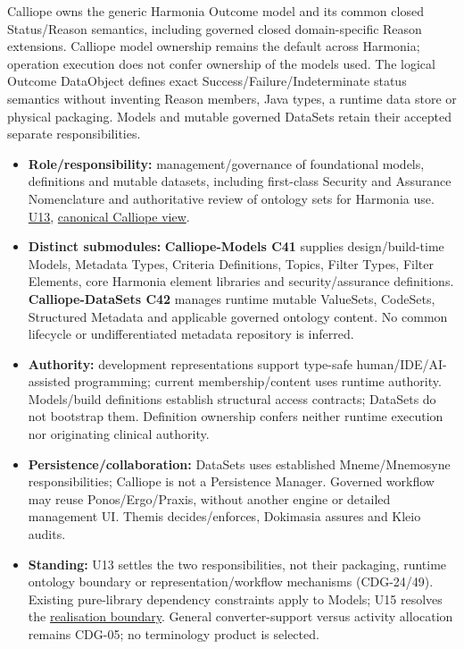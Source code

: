 Calliope owns the generic Harmonia Outcome model and its common closed Status/Reason semantics, including governed closed domain-specific Reason extensions. Calliope model ownership remains the default across Harmonia; operation execution does not confer ownership of the models used. The logical Outcome DataObject defines exact Success/Failure/Indeterminate status semantics without inventing Reason members, Java types, a runtime data store or physical packaging. Models and mutable governed DataSets retain their accepted separate responsibilities.



\begin{itemize}


\item \textbf{Role/responsibility:} management/governance of foundational models, definitions
  and mutable datasets, including first-class Security and Assurance Nomenclature
  and authoritative review of ontology sets for Harmonia use. \href{\detokenize{../../../../../docs/markdown/05-information-systems-architecture/sources.md#u13}}{U13},
  \href{\detokenize{../../../../../docs/markdown/05-information-systems-architecture/calliope-models-and-datasets.md}}{canonical Calliope view}.

\item \textbf{Distinct submodules:} \textbf{Calliope-Models C41} supplies design/build-time
  Models, Metadata Types, Criteria Definitions, Topics, Filter Types, Filter Elements,
  core Harmonia element libraries and security/assurance definitions.
  \textbf{Calliope-DataSets C42} manages runtime mutable ValueSets, CodeSets, Structured
  Metadata and applicable governed ontology content. No common lifecycle or
  undifferentiated metadata repository is inferred.

\item \textbf{Authority:} development representations support type-safe human/IDE/AI-assisted
  programming; current membership/content uses runtime authority. Models/build
  definitions establish structural access contracts; DataSets do not bootstrap them.
  Definition ownership confers neither runtime execution nor originating clinical authority.

\item \textbf{Persistence/collaboration:} DataSets uses established Mneme/Mnemosyne
  responsibilities; Calliope is not a Persistence Manager. Governed workflow may
  reuse Ponos/Ergo/Praxis, without another engine or detailed management UI.
  Themis decides/enforces, Dokimasia assures and Kleio audits.

\item \textbf{Standing:} U13 settles the two responsibilities, not their packaging, runtime
  ontology boundary or representation/workflow mechanisms (CDG-24/49). Existing
  pure-library dependency constraints apply to Models; U15 resolves the
  \href{\detokenize{../../../../../docs/markdown/05-information-systems-architecture/calliope-models-and-datasets.md#calliope-realisation}}{realisation boundary}.
  General converter-support
  versus activity allocation remains CDG-05; no terminology product is selected.

\end{itemize}
